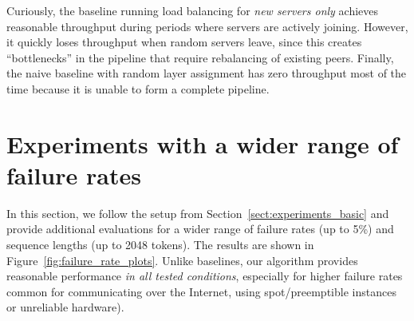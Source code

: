 Curiously, the baseline running load balancing for \textit{new servers only} achieves reasonable throughput during periods where servers are actively joining. However, it quickly loses throughput when random servers leave, since this creates ``bottlenecks'' in the pipeline that require rebalancing of existing peers. Finally, the naive baseline with random layer assignment has zero throughput most of the time because it is unable to form a complete pipeline.

\section{Experiments with a wider range of failure rates}\label{appendix:failure_rate_plots}

In this section, we follow the setup from Section~\ref{sect:experiments_basic} and provide additional evaluations for a wider range of failure rates (up to 5\%) and sequence lengths (up to 2048 tokens). The results are shown in Figure~\ref{fig:failure_rate_plots}. Unlike baselines, our algorithm provides reasonable performance \textit{in all tested conditions}, especially for higher failure rates common for communicating over the Internet, using spot/preemptible instances or unreliable hardware).

